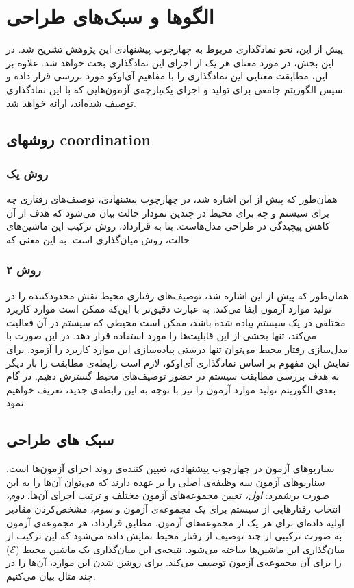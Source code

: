 \section{الگوها و سبک‌های طراحی}
\label{section:extracted_patterns}
پیش از این، نحو نمادگذاری مربوط به چهارچوب پیشنهادی این پژوهش تشریح شد. در این بخش، در مورد معنای هر یک از اجزای این نمادگذاری بحث خواهد شد. علاوه بر این، مطابقت معنایی این نمادگذاری را با مفاهیم آی‌اوکو مورد بررسی قرار داده و سپس الگوریتم جامعی برای تولید و اجرای یک‌پارچه‌ی آزمون‌هایی که با این نمادگذاری توصیف شده‌اند، ارائه خواهد شد.

\subsection{روشهای coordination }

\subsubsection{روش یک}
همان‌طور که پیش از این اشاره شد،‌ در چهارچوب پیشنهادی، توصیف‌های رفتاری چه برای سیستم و چه برای محیط در چندین نمودار حالت بیان می‌شود که هدف از آن کاهش پیچیدگی در طراحی مدل‌هاست. بنا به قرارداد، روش ترکیب این ماشین‌های حالت، روش میان‌گذاری است. به این معنی که 
\subsubsection{روش ۲}
همان‌طور که پیش از این اشاره شد، توصیف‌های رفتاری محیط نقش محدود‌کننده را در تولید موارد آزمون ایفا می‌کند. به عبارت دقیق‌تر با این‌که ممکن است موارد کاربرد مختلفی در یک سیستم پیاده شده باشد، ممکن است محیطی که سیستم در آن فعالیت می‌کند، تنها بخشی از این قابلیت‌ها را مورد استفاده قرار دهد. در این صورت با مدل‌سازی رفتار محیط می‌توان تنها درستی پیاده‌سازی این موارد کاربرد را آزمود. برای نمایش این مفهوم بر اساس نمادگذاری آی‌اوکو، لازم است رابطه‌ی مطابقت را بار دیگر به هدف بررسی مطابقت سیستم در حضور توصیف‌های محیط گسترش دهیم. در گام بعدی الگوریتم تولید موارد آزمون را نیز با توجه به این رابطه‌ی جدید، تعریف خواهیم نمود.



\subsection{سبک های طراحی}
سناریو‌های آزمون در چهارچوب پیشنهادی، تعیین کننده‌‌ی روند اجرای آزمون‌ها است. سناریو‌های آزمون سه وظیفه‌ی اصلی را بر عهده دارند که می‌توان آن‌ها را به این صورت برشمرد: \textit{اول،} تعیین مجموعه‌های آزمون مختلف و ترتیب اجرای آن‌ها. \textit{دوم،} انتخاب رفتارهایی از سیستم برای یک مجموعه‌ی آزمون و \textit{سوم،} مشخص‌کردن مقادیر اولیه داده‌ای برای هر یک از مجموعه‌های آزمون. مطابق قرارداد، هر مجموعه‌ی آزمون به صورت ترکیبی از چند توصیف از رفتار محیط نمایش داده می‌شود که این ترکیب از میان‌گذاری این ماشین‌ها ساخته می‌شود. نتیجه‌ی این میان‌گذاری یک ماشین‌ محیط ($\mathcal{E}$) را برای آن مجموعه‌ی آزمون توصیف می‌کند. برای روشن شدن این موارد، آن‌ها را در چند مثال بیان می‌کنیم.

